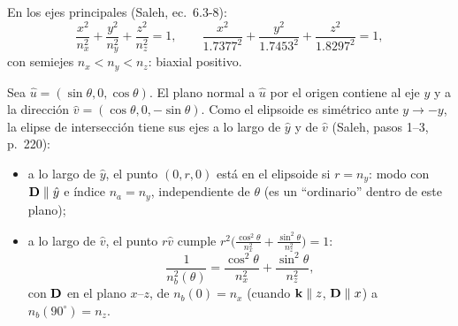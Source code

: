 
\label{sol:25}

 En los ejes principales (Saleh, ec.~6.3-8):
\[
\frac{x^2}{n_x^2}+\frac{y^2}{n_y^2}+\frac{z^2}{n_z^2}=1,\qquad \frac{x^2}{1.7377^2}+\frac{y^2}{1.7453^2}+\frac{z^2}{1.8297^2}=1,
\]
con semiejes $n_x<n_y<n_z$: biaxial positivo.

 Sea $\hat u=(\sin\theta,0,\cos\theta)$. El plano normal a $\hat u$ por el origen contiene al eje $y$ y a
la dirección $\hat v=(\cos\theta,0,-\sin\theta)$. Como el elipsoide es simétrico ante $y\to-y$, la elipse
de intersección tiene sus ejes a lo largo de $\hat y$ y de $\hat v$ (Saleh, pasos 1--3, p.~220):
\begin{itemize}
\item a lo largo de $\hat y$, el punto $(0,r,0)$ está en el elipsoide si $r=n_y$: modo con $\mathbf D\parallel\hat y$
e índice $n_a=n_y$, independiente de $\theta$ (es un ``ordinario'' dentro de este plano);
\item a lo largo de $\hat v$, el punto $r\hat v$ cumple $r^2\big(\frac{\cos^2\theta}{n_x^2}+\frac{\sin^2\theta}{n_z^2}\big)=1$:
\[
\frac{1}{n_b^2(\theta)}=\frac{\cos^2\theta}{n_x^2}+\frac{\sin^2\theta}{n_z^2},
\]
con $\mathbf D$ en el plano $x$--$z$, de $n_b(0)=n_x$ (cuando $\mathbf k\parallel z$, $\mathbf D\parallel x$) a $n_b(90^\circ)=n_z$.
\end{itemize}

